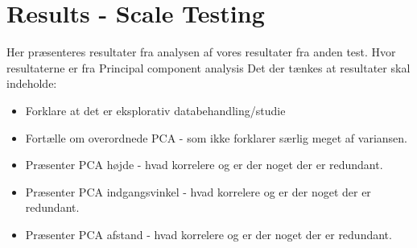 \section{{\color{red}Results - Scale Testing}}
\label{ResultsScaleTesting}
%
{\color{red} Her præsenteres resultater fra analysen af vores resultater fra anden test. Hvor resultaterne er fra Principal component analysis}\blankline
%
Det der tænkes at resultater skal indeholde: 
\begin{itemize}
	\item Forklare at det er eksplorativ databehandling/studie
	\item Fortælle om overordnede PCA - som ikke forklarer særlig meget af variansen.
	\item Præsenter PCA højde - hvad korrelere og er der noget der er redundant.
	\item Præsenter PCA indgangsvinkel - hvad korrelere og er der noget der er redundant.
	\item Præsenter PCA afstand - hvad korrelere og er der noget der er redundant.
\end{itemize}
